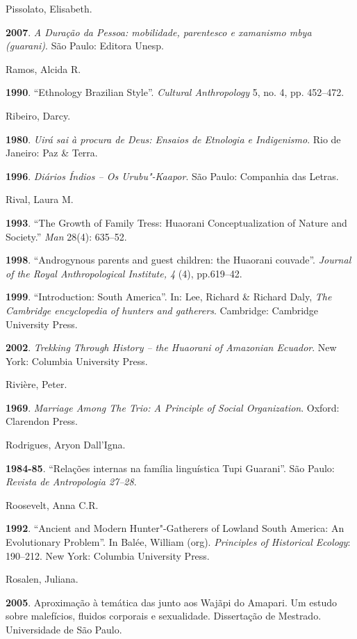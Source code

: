 \begin{Parskip}
Pissolato, Elisabeth.

\textbf{2007}. \emph{A Duração da Pessoa: mobilidade, parentesco e
xamanismo mbya (guarani)}. São Paulo: Editora Unesp.

Ramos, Alcida R.

\textbf{1990}. ``Ethnology Brazilian Style''. \emph{Cultural Anthropology}
5, no. 4, pp. 452--472.

Ribeiro, Darcy.

\textbf{1980}. \emph{Uirá sai à procura de Deus: Ensaios de Etnologia e
Indigenismo}. Rio de Janeiro: Paz \& Terra.

\textbf{1996}. \emph{Diários Índios -- Os Urubu"-Kaapor}. São Paulo:
Companhia das Letras.

Rival, Laura M.

\textbf{1993}. ``The Growth of Family Tress: Huaorani Conceptualization
of Nature and Society.'' \emph{Man} 28(4): 635--52.

\textbf{1998}. ``Androgynous parents and guest children: the Huaorani
couvade''. \emph{Journal of the Royal Anthropological Institute, 4} (4),
pp.619--42.

\textbf{1999}. ``Introduction: South America''. In: Lee, Richard \& Richard
Daly, \emph{The Cambridge encyclopedia of hunters and gatherers}.
Cambridge: Cambridge University Press.

\textbf{2002}. \emph{Trekking Through History -- the Huaorani of
Amazonian Ecuador}. New York: Columbia University Press.

Rivière, Peter.

\textbf{1969}. \emph{Marriage Among The Trio: A Principle of Social
Organization}. Oxford: Clarendon Press.

Rodrigues, Aryon Dall'Igna.

\textbf{1984-85}. ``Relações internas na família linguística Tupi
Guarani''. São Paulo: \emph{Revista de Antropologia 27--28}.

Roosevelt, Anna C.R.

\textbf{1992}. ``Ancient and Modern Hunter"-Gatherers of Lowland South
America: An Evolutionary Problem''. In Balée, William (org).
\emph{Principles of Historical Ecology}: 190--212. New York: Columbia
University Press.

Rosalen, Juliana.

\textbf{2005}. Aproximação à temática das  junto aos Wajãpi do
Amapari. Um estudo sobre malefícios, fluidos corporais e sexualidade.
Dissertação de Mestrado. Universidade de São Paulo.


\end{Parskip}
